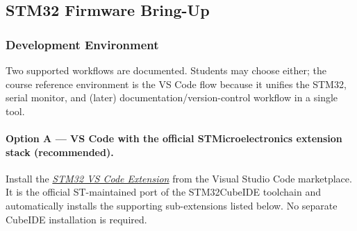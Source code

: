 \documentclass[11pt,letterpaper]{article}
\begin{document}
	\subsection{STM32 Firmware Bring-Up}
	
	\subsubsection{Development Environment}\label{sec:stm32_env}

	Two supported workflows are documented. Students may choose either; the course reference environment is the VS Code flow because it unifies the STM32, serial monitor, and (later) documentation/version-control workflow in a single tool.

	\paragraph{Option A --- VS Code with the official STMicroelectronics extension stack (recommended).}
	Install the \href{https://marketplace.visualstudio.com/items?itemName=stmicroelectronics.stm32-vscode-extension}{\textit{STM32 VS Code Extension}} from the Visual Studio Code marketplace. It is the official ST-maintained port of the STM32CubeIDE toolchain and automatically installs the supporting sub-extensions listed below. No separate CubeIDE installation is required.
\end{document}
